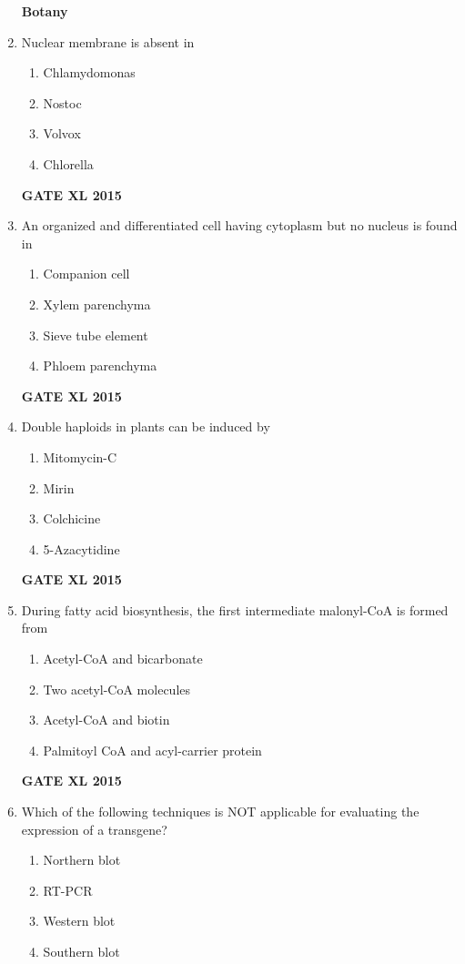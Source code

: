 \documentclass[journal,12pt,onecolumn]{IEEEtran}
\begin{document}
\begin{enumerate}
	\textbf{Botany}
\item Nuclear membrane is absent in
    \begin{enumerate}
            \item Chlamydomonas
	    \item Nostoc
	    \item Volvox
            \item Chlorella
    \end{enumerate}
\hfill{\textbf{GATE XL 2015}}
\item An organized and differentiated cell having cytoplasm but no nucleus is found in
    \begin{enumerate}
            \item Companion cell
	    \item Xylem parenchyma
	    \item Sieve tube element
            \item Phloem parenchyma
    \end{enumerate}
\hfill{\textbf{GATE XL 2015}}
\item Double haploids in plants can be induced by
    \begin{enumerate}
            \item Mitomycin-C
	    \item Mirin
	    \item Colchicine
            \item 5-Azacytidine
    \end{enumerate}
\hfill{\textbf{GATE XL 2015}}
\item During fatty acid biosynthesis, the first intermediate malonyl-CoA is formed from 
    \begin{enumerate}
            \item Acetyl-CoA and bicarbonate
	    \item Two acetyl-CoA molecules
	    \item Acetyl-CoA and biotin
            \item  Palmitoyl CoA and acyl-carrier protein 
	\end{enumerate}
\hfill{\textbf{GATE XL 2015}}
\item  Which of the following techniques is NOT applicable for evaluating the expression of a transgene?
        \begin{enumerate} 
            \item Northern blot
	    \item RT-PCR
	    \item Western blot
            \item Southern blot

\end{enumerate}
\end{enumerate}
\end{document}
